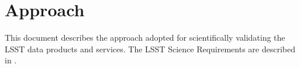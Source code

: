 \section{Approach} \label{sec:approach}

This document describes the approach adopted for scientifically validating the  LSST data products and services. 
The  LSST Science Requirements  are described in .